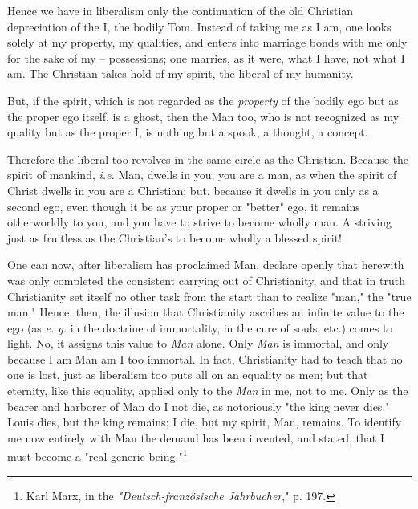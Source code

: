 Hence we have in liberalism only the continuation of the old Christian 
depreciation of the I, the bodily Tom. Instead of taking me as I am, one looks 
solely at my property, my qualities, and enters into marriage bonds with me 
only for the sake of my -- possessions; one marries, as it were, what I have, 
not what I am. The Christian takes hold of my spirit, the liberal of my 
humanity.

But, if the spirit, which is not regarded as the \textit{property} of the 
bodily ego but as the proper ego itself, is a ghost, then the Man too, who is 
not recognized as my quality but as the proper I, is nothing but a spook, a 
thought, a concept.

Therefore the liberal too revolves in the same circle as the Christian. 
Because the spirit of mankind, \textit{i.e.} Man, dwells in you, you are a 
man, as when the spirit of Christ dwells in you are a Christian; but, because 
it dwells in you only as a second ego, even though it be as your proper or 
"{}better"{} ego, it remains otherworldly to you, and you have to strive to 
become wholly man. A striving just as fruitless as the Christian's to become 
wholly a blessed spirit!

One can now, after liberalism has proclaimed Man, declare openly that herewith 
was only completed the consistent carrying out of Christianity, and that in 
truth Christianity set itself no other task from the start than to realize 
"{}man,"{} the "{}true man."{} Hence, then, the illusion that Christianity 
ascribes an infinite value to the ego (as \textit{e. g.} in the doctrine of 
immortality, in the cure of souls, etc.) comes to light. No, it assigns this 
value to \textit{Man} alone. Only \textit{Man} is immortal, and only because I 
am Man am I too immortal. In fact, Christianity had to teach that no one is 
lost, just as liberalism too puts all on an equality as men; but that 
eternity, like this equality, applied only to the \textit{Man} in me, not to 
me. Only as the bearer and harborer of Man do I not die, as notoriously "{}the 
king never dies."{} Louis dies, but the king remains; I die, but my spirit, 
Man, remains. To identify me now entirely with Man the demand has been 
invented, and stated, that I must become a "{}real generic 
being."{}\footnote{Karl Marx, in the \textit{"{}Deutsch-franz\"osische 
Jahrbucher},"{} p. 197.}

